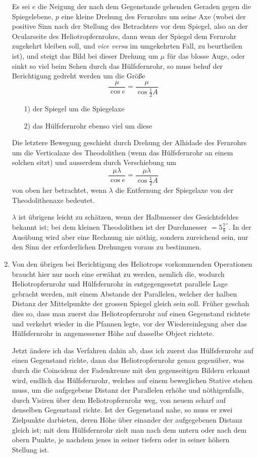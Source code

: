 \documentclass[12pt,a4paper]{article}
\theoremstyle{plain}
\theoremstyle{definition}
\theoremstyle{remark}
\begin{document}
\begin{enumerate}[label=\arabic*.]
Es sei $e$ die Neigung der nach dem Gegenstande gehenden Geraden gegen die Spiegelebene, $p$ eine kleine Drehung des Fernrohrs um seine Axe (wobei der positive Sinn nach der Stellung des Betrachters vor dem Spiegel, also an der Ocularseite des Heliotropfernrohrs, dann wenn der Spiegel dem Fernrohr zugekehrt bleiben soll, und \textit{vice versa} im umgekehrten Fall, zu beurtheilen ist), und steigt das Bild bei dieser Drehung um $\mu$ f\"ur das blosse Auge, oder sinkt so viel beim Sehen durch das H\"ulfsfernrohr, so muss behuf der Berichtigung gedreht werden um die Gr\"o\ss e
\[
\frac{\mu}{\cos e} = \frac{\mu}{\cos\tfrac{1}{2}A}
\]
\begin{enumerate}
\item[1)] der Spiegel um die Spiegelaxe
\item[2)] das H\"ulfsfernrohr ebenso viel um diese
\end{enumerate}
Die letztere Bewegung geschieht durch Drehung der Alhidade des Fernrohrs um die Verticalaxe des Theodolithen (wenn das H\"ulfsfernrohr an einem solchen sitzt) und ausserdem durch Verschiebung um
\[
\frac{\mu\lambda}{\cos e} = \frac{\mu\lambda}{\cos\tfrac{1}{2}A}
\]
von oben her betrachtet, wenn $\lambda$ die Entfernung der Spiegelaxe von der Theodolithenaxe bedeutet.

$\lambda$ ist \"ubrigens leicht zu sch\"atzen, wenn der Halbmesser des Gesichtsfeldes bekannt ist; bei dem kleinen Theodolithen ist der Durchmesser $= 5\tfrac78^{\circ}$. In der Aus\"ubung wird aber eine Rechnung nie n\"othig, sondern zureichend sein, nur den Sinn der erforderlichen Drehungen voraus zu bestimmen.

\item Von den \"ubrigen bei Berichtigung des Heliotrops vorkommenden Operationen braucht hier nur noch eine erw\"ahnt zu werden, nemlich die, wodurch Heliotropfernrohr und H\"ulfsfernrohr in entgegengesetzt parallele Lage gebracht werden, mit einem Abstande der Parallelen, welcher der halben Distanz der Mittelpunkte der grossen Spiegel gleich sein soll. Fr\"uher geschah dies so, dass man zuerst das Heliotropfernrohr auf einen Gegenstand richtete und verkehrt wieder in die Pfannen legte, vor der Wiedereinlegung aber das H\"ulfsfernrohr in angemessener H\"ohe auf dasselbe Object richtete.

Jetzt \"andere ich das Verfahren dahin ab, dass ich zuerst das H\"ulfsfernrohr auf einen Gegenstand richte, dann das Heliotropfernrohr genau gegen\"uber, was durch die Coincidenz der Fadenkreuze mit den gegenseitigen Bildern erkannt wird, endlich das H\"ulfsfernrohr, welches auf einem beweglichen Stative stehen muss, um die aufgegebene Distanz der Parallelen erh\"ohe und n\"othigenfalls, durch Visiren \"uber dem Heliotropfernrohr weg, von neuem scharf auf denselben Gegenstand richte. Ist der Gegenstand nahe, so muss er zwei Zielpunkte darbieten, deren H\"ohe \"uber einander der aufgegebenen Distanz gleich ist; mit dem H\"ulfsfernrohr zielt man nach dem untern oder nach dem obern Punkte, je nachdem jenes in seiner tiefern oder in seiner h\"ohern Stellung ist.
\end{enumerate}
\end{document}
